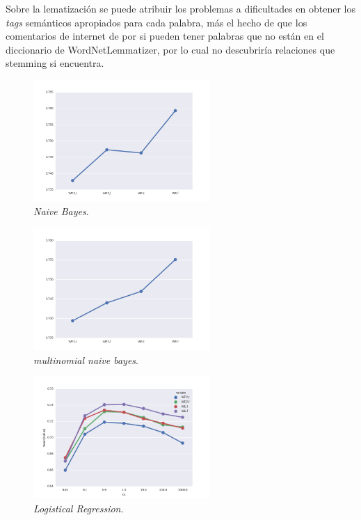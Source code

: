\documentclass[11pt,letterpaper]{article}
\begin{document}
Sobre la lematización se puede atribuir los problemas a dificultades en
obtener los \emph{tags} semánticos apropiados para cada palabra, más el hecho de
que los comentarios de internet de por si pueden tener palabras que no están
en el diccionario de WordNetLemmatizer, por lo cual no descubriría relaciones
que stemming si encuentra. 

\begin{figure}[H]
\centering
\includegraphics[width=0.6\textwidth]{p2_f1_naive.png}
\caption{\emph{Naive Bayes}.}
\end{figure} 


\begin{figure}[H]
\centering
\includegraphics[width=0.6\textwidth]{p2_f1_multinomial.png}
\caption{\emph{multinomial naive bayes}.}
\end{figure} 


\begin{figure}[H]
\centering
\includegraphics[width=0.6\textwidth]{p2_f1_logit.png}
\caption{\emph{Logistical Regression}.}
\end{figure} 
\end{document}
